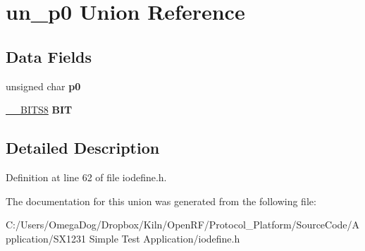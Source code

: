 \hypertarget{unionun__p0}{\section{un\-\_\-p0 Union Reference}
\label{unionun__p0}
}
\subsection*{Data Fields}
\begin{DoxyCompactItemize}
\item 
\hypertarget{unionun__p0_a15867303ccca756ff314f12c803867d6}{unsigned char {\bfseries p0}}\label{unionun__p0_a15867303ccca756ff314f12c803867d6}

\item 
\hypertarget{unionun__p0_ab850b0e555c75241c90cbf8ece1e838a}{\hyperlink{struct_____b_i_t_s8}{\-\_\-\-\_\-\-B\-I\-T\-S8} {\bfseries B\-I\-T}}\label{unionun__p0_ab850b0e555c75241c90cbf8ece1e838a}

\end{DoxyCompactItemize}


\subsection{Detailed Description}


Definition at line 62 of file iodefine.\-h.



The documentation for this union was generated from the following file\-:\begin{DoxyCompactItemize}
\item 
C\-:/\-Users/\-Omega\-Dog/\-Dropbox/\-Kiln/\-Open\-R\-F/\-Protocol\-\_\-\-Platform/\-Source\-Code/\-Application/\-S\-X1231 Simple Test Application/iodefine.\-h\end{DoxyCompactItemize}
